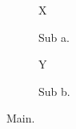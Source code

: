\documentclass{article}
\begin{document}
\begin{figure}
\begin{subfigure}{.4\textwidth}X\caption{Sub a.}\end{subfigure}
\begin{subfigure}{.4\textwidth}\caption{Sub b.}Y\end{subfigure}
\caption{Main.}\end{figure}
\end{document}
